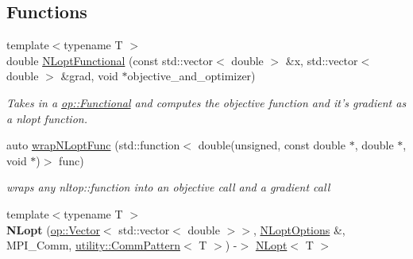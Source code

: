 \subsection*{Functions}
\begin{DoxyCompactItemize}
\item 
{\footnotesize template$<$typename T $>$ }\\double \hyperlink{namespaceop_a3be0af95e75c10df9a1149efba8d405c}{N\-Lopt\-Functional} (const std\-::vector$<$ double $>$ \&x, std\-::vector$<$ double $>$ \&grad, void $\ast$objective\-\_\-and\-\_\-optimizer)
\begin{DoxyCompactList}\small\item\em Takes in a \hyperlink{classop_1_1Functional}{op\-::\-Functional} and computes the objective function and it's gradient as a nlopt function. \end{DoxyCompactList}\item 
auto \hyperlink{namespaceop_abed0d2e6e8f87c2e28cd8e192b32553b}{wrap\-N\-Lopt\-Func} (std\-::function$<$ double(unsigned, const double $\ast$, double $\ast$, void $\ast$)$>$ func)
\begin{DoxyCompactList}\small\item\em wraps any nltop\-::function into an objective call and a gradient call \end{DoxyCompactList}\item 
\hypertarget{namespaceop_a762b8f7ff1d80b469f7b7ad95cd246e5}{{\footnotesize template$<$typename T $>$ }\\{\bfseries N\-Lopt} (\hyperlink{classop_1_1Vector}{op\-::\-Vector}$<$ std\-::vector$<$ double $>$$>$, \hyperlink{structop_1_1NLoptOptions}{N\-Lopt\-Options} \&, M\-P\-I\-\_\-\-Comm, \hyperlink{structop_1_1utility_1_1CommPattern}{utility\-::\-Comm\-Pattern}$<$ T $>$) -\/$>$ \hyperlink{classop_1_1NLopt}{N\-Lopt}$<$ T $>$}\label{namespaceop_a762b8f7ff1d80b469f7b7ad95cd246e5}


\end{DoxyCompactItemize}
